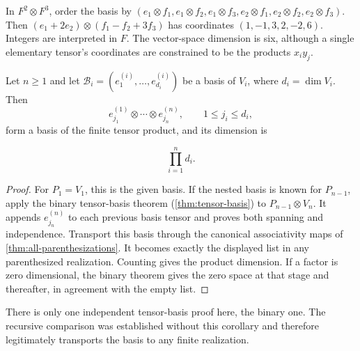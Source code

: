 \begin{example}
In $F^2\otimes F^3$, order the basis by
$(e_1\otimes f_1,e_1\otimes f_2,e_1\otimes f_3,
e_2\otimes f_1,e_2\otimes f_2,e_2\otimes f_3)$.
Then $(e_1+2e_2)\otimes(f_1-f_2+3f_3)$ has coordinates
$(1,-1,3,2,-2,6)$. Integers are interpreted in $F$.
The vector-space dimension is six, although a single elementary tensor's
coordinates are constrained to be the products $x_i y_j$.
\end{example}

\begin{corollary}\label{cor:finite-tensor-basis}
Let $n\geq1$ and let
$\mathcal B_i=(e_1^{(i)},\ldots,e_{d_i}^{(i)})$ be a basis of $V_i$,
where $d_i=\dim V_i$. Then
\[
e_{j_1}^{(1)}\otimes\cdots\otimes e_{j_n}^{(n)},\qquad
1\leq j_i\leq d_i,
\]
form a basis of the finite tensor product, and its dimension is

\[
\prod_{i=1}^n d_i.
\]

\end{corollary}
\begin{proof}
For $P_1=V_1$, this is the given basis. If the nested basis is known
for $P_{n-1}$, apply the binary tensor-basis theorem
(\cref{thm:tensor-basis}) to $P_{n-1}\otimes V_n$.
It appends $e_{j_n}^{(n)}$ to each previous basis tensor and proves
both spanning and independence. Transport this basis through the canonical associativity maps of
\cref{thm:all-parenthesizations}. It becomes exactly the displayed list
in any parenthesized realization. Counting gives the product dimension.
If a factor is zero dimensional, the binary theorem gives the zero
space at that stage and thereafter, in agreement with the empty list.
\end{proof}
There is only one independent tensor-basis proof here, the binary one.
The recursive comparison was established without this corollary and
therefore legitimately transports the basis to any finite realization.

